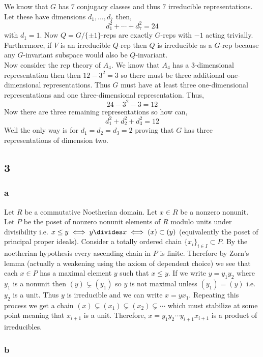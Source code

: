 \documentclass[12pt]{article}
\begin{document}
We know that $G$ has $7$ conjugacy classes and thus $7$ irreducible representations. Let these have dimensions $d_1, \dots, d_7$ then,
\[ d_1^2 + \cdots + d_7^2 = 24 \]
with $d_1 = 1$. Now $Q = G/\{ \pm 1 \}$-reps are exactly $G$-reps with $-1$ acting trivially. Furthermore, if $V$ is an irreducible $Q$-rep then $Q$ is irreducible as a $G$-rep because any $G$-invariant subspace would also be $Q$-invariant.
\bigskip\\
Now consider the rep theory of $A_4$. We know that $A_4$ has a $3$-dimensional representation then then $12 - 3^2 = 3$ so there must be three additional one-dimensional representations. Thus $G$ must have at least three one-dimensional representations and one three-dimensional representation. Thus,
\[ 24 - 3^2 - 3 = 12 \] 
Now there are three remaining representations so how can,
\[ d_1^2 + d_2^2 + d_3^2 = 12 \]
Well the only way is for $d_1 = d_2 = d_3 = 2$ proving that $G$ has three representations of dimension two. 

\subsection{3}

\subsubsection{a}

Let $R$ be a commutative Noetherian domain. Let $x \in R$ be a nonzero nonunit. Let $P$ be the poset of nonzero nonunit elements of $R$ modulo units under divisibility i.e. $x \le y \iff y \divides x \iff (x) \subset (y)$ (equivalently the poset of principal proper ideals). Consider a totally ordered chain $\{ x_i \}_{i \in I} \subset P$. By the noetherian hypothesis every ascending chain in $P$ is finite. Therefore by Zorn's lemma (actually a weakening using the axiom of dependent choice) we see that each $x \in P$ has a maximal element $y$ such that $x \le y$. If we write $y = y_1 y_2$ where $y_1$ is a nonunit then $(y) \subsetneq (y_1)$ so $y$ is not maximal unless $(y_1) = (y)$ i.e. $y_2$ is a unit. Thus $y$ is irreducible and we can write $x = y x_1$. Repeating this process we get a chain $(x) \subsetneq (x_1) \subsetneq (x_2) \subsetneq \cdots$ which must stabilize at some point meaning that $x_{i+1}$ is a unit. Therefore, $x = y_1 y_2 \cdots y_{i+1} x_{i+1}$ is a product of irreducibles. 

\subsubsection{b}
\end{document}
